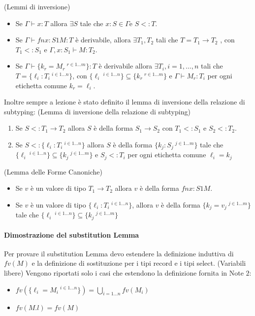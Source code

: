 (Lemmi di inversione)
\begin{itemize}
	\item Se $\Gamma \vdash x : T$ allora $\exists S$ tale che $x : S \in \Gamma $e $S <: T$.
	\item Se $\Gamma \vdash fn x:S1M : T$ \`e derivabile, allora $\exists T_1, T_2$ tali che $T = T_1 \rightarrow T_2$ , con $T_1 <: S_1$ e
	$\Gamma, x : S_1 \vdash M : T_2$.
	\item Se $\Gamma \vdash \{k_r = M_r\ ^{r \in 1\dots m}\} : T$ \`e derivabile allora
	$\exists T_i, i = 1, \dots, n$ tali che $T = \{\ell_i : T_i\ ^{i \in 1\dots n}\}$,
	con $\{\ell_i\ ^{i \in 1 \dots n}\} \subseteq \{k_r\ ^{r \in 1 \dots m} \}$
	e $\Gamma \vdash M_r : T_i$ per ogni etichetta comune $k_r = \ell_i$.
\end{itemize}

Inoltre sempre a lezione \`e stato definito il lemma di inversione della relazione di subtyping:
(Lemma di inversione della relazione di subtyping)
	\begin{enumerate}
	\item Se $S <: T_1 \rightarrow T_2$ allora $S$ \`e della forma $S_1 \rightarrow S_2$ con $T_1 <: S_1$ e $S_2 <: T_2$.
	\item Se $S <: \{\ell_i : T_i\ ^{i \in 1 \dots n} \}$ allora $S$ \`e della forma
	$\{k_j : S_j\ ^{j \in 1 \dots m} \}$ tale che $\{\ell_i\ ^{i \in 1 \dots n}\} \subseteq \{k_j\ ^{j \in 1 \dots m} \}$ e $S_j <: T_i$ per ogni etichetta comune
	$\ell_i = k_j$
	\end{enumerate}

(Lemma delle Forme Canoniche)
\begin{itemize}
 \item Se $v$ \`e un valore di tipo $T_1 \rightarrow T_2$ allora $v$ \`e della forma $fn x:S1M$.
 \item Se $v$ \`e un valore di tipo $\{\ell_i:T_i\ ^{i \in 1 \dots n}\}$, allora $v$ \`e della forma $\{k_j = v_j\ ^{j \in 1 \dots m} \}$
 tale che $\{\ell_i\ ^{i \in 1 \dots n} \} \subseteq \{k_j\ ^{j \in 1 \dots m}\}$
\end{itemize}

\paragraph{Dimostrazione del substitution Lemma}
Per provare il substitution Lemma devo estendere la definizione induttiva di $fv(M)$ e la definizione di sostituzione per i tipi 
record e i tipi select.
(Variabili libere)
	Vengono riportati solo i casi che estendono la definizione fornita in Note $2$:
	\begin{itemize}
		\item $fv(\{\ell_i = M_i\ ^{i \in 1 \dots n} \}) = \bigcup_{i = 1 \dots n} fv(M_i)$
		\item $fv(M.l) = fv(M)$
	\end{itemize}


